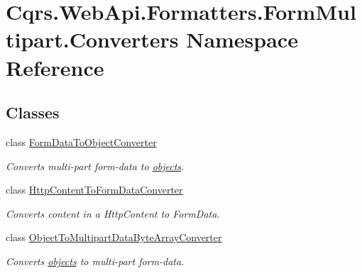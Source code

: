\hypertarget{namespaceCqrs_1_1WebApi_1_1Formatters_1_1FormMultipart_1_1Converters}{}\section{Cqrs.\+Web\+Api.\+Formatters.\+Form\+Multipart.\+Converters Namespace Reference}
\label{namespaceCqrs_1_1WebApi_1_1Formatters_1_1FormMultipart_1_1Converters}
\subsection*{Classes}
\begin{DoxyCompactItemize}
\item 
class \hyperlink{classCqrs_1_1WebApi_1_1Formatters_1_1FormMultipart_1_1Converters_1_1FormDataToObjectConverter}{Form\+Data\+To\+Object\+Converter}
\begin{DoxyCompactList}\small\item\em Converts multi-\/part form-\/data to \hyperlink{}{objects}. \end{DoxyCompactList}\item 
class \hyperlink{classCqrs_1_1WebApi_1_1Formatters_1_1FormMultipart_1_1Converters_1_1HttpContentToFormDataConverter}{Http\+Content\+To\+Form\+Data\+Converter}
\begin{DoxyCompactList}\small\item\em Converts content in a Http\+Content to Form\+Data. \end{DoxyCompactList}\item 
class \hyperlink{classCqrs_1_1WebApi_1_1Formatters_1_1FormMultipart_1_1Converters_1_1ObjectToMultipartDataByteArrayConverter}{Object\+To\+Multipart\+Data\+Byte\+Array\+Converter}
\begin{DoxyCompactList}\small\item\em Converts \hyperlink{}{objects} to multi-\/part form-\/data. \end{DoxyCompactList}\end{DoxyCompactItemize}
